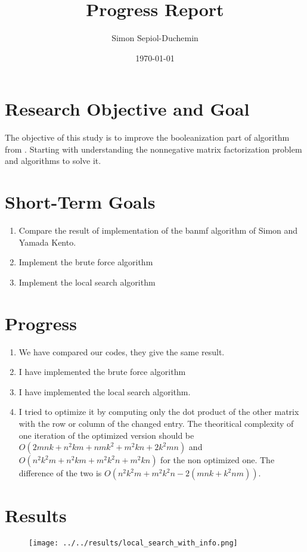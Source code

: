 \documentclass[a4paper,11pt]{article}
\title{Progress Report}
\author{Simon Sepiol-Duchemin}
\date{\today}
\begin{document}
%
\maketitle
\thispagestyle{empty}
%
\section{Research Objective and Goal}
The objective of this study is to improve the booleanization part of algorithm from \cite{9521203}. Starting with understanding the nonnegative matrix factorization problem and algorithms to solve it.
\section{Short-Term Goals}
\begin{enumerate}
\item Compare the result of implementation of the banmf algorithm of Simon and Yamada Kento.
\item Implement the brute force algorithm
\item Implement the local search algorithm 
\end{enumerate}
\section{Progress}
\begin{enumerate}
\item We have compared our codes, they give the same result.
\item I have implemented the brute force algorithm
\item I have implemented the local search algorithm.
\item I tried to optimize it by computing only the dot product of the other matrix with the row or column of the changed entry. The theoritical complexity of one iteration of the optimized version should be $O(2mnk + n^2km + nmk^2 + m^2kn +2k^2mn)$ and $O(n^2k^2m + n^2km+m^2k^2n+m^2kn)$ for the non optimized one. The difference of the two is $O(n^2k^2m+m^2k^2n - 2(mnk+k^2nm))$.
\end{enumerate}

\section{Results}
\begin{center}
    
\begin{figure}[H]
    \begin{center}
        \texttt{[image: ../../results/local\_search\_with\_info.png]}  
    \end{center}
\end{figure}
\end{center}





\end{document}
